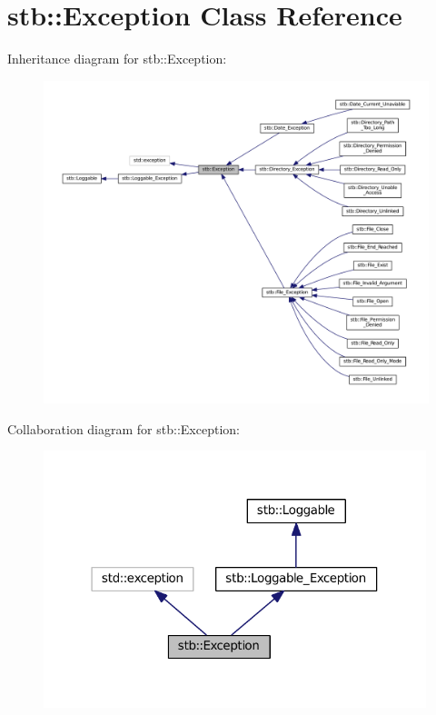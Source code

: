 \hypertarget{classstb_1_1Exception}{\section{stb\+:\+:Exception Class Reference}
\label{classstb_1_1Exception}
}


Inheritance diagram for stb\+:\+:Exception\+:
\nopagebreak
\begin{figure}[H]
\begin{center}
\leavevmode
\includegraphics[width=350pt]{classstb_1_1Exception__inherit__graph}
\end{center}
\end{figure}


Collaboration diagram for stb\+:\+:Exception\+:
\nopagebreak
\begin{figure}[H]
\begin{center}
\leavevmode
\includegraphics[width=316pt]{classstb_1_1Exception__coll__graph}
\end{center}
\end{figure}
